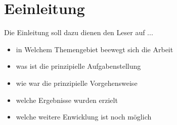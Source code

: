 \chapter{Eeinleitung}\label{kap:einleitung2}

Die Einleitung soll dazu dienen den Leser auf ...

\begin{itemize}
    \item in Welchem Themengebiet beewegt sich die Arbeit
    \item was ist die prinzipielle Aufgabenstellung
    \item wie war die prinzipielle Vorgehensweise
    \item welche Ergebnisse wurden erzielt
    \item welche weitere Enwicklung ist noch möglich
\end{itemize}

